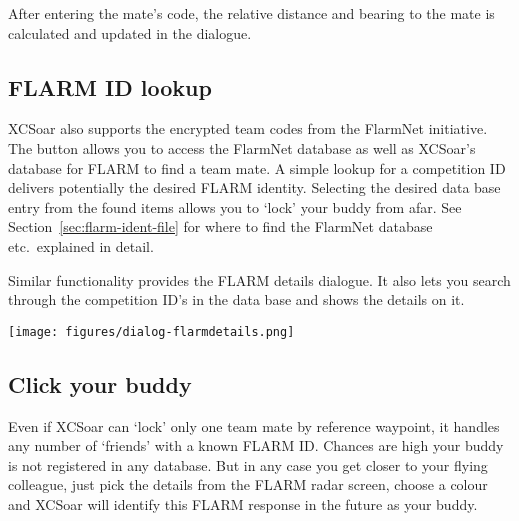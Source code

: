After entering the mate's code, the relative distance and 
bearing to the mate is calculated and updated in the dialogue.


\subsection*{FLARM ID lookup}

XCSoar also supports the encrypted team codes from the FlarmNet initiative.
The  button allows you to access the FlarmNet database as well
as XCSoar's database for FLARM to find a team mate. A simple
lookup for a competition ID delivers potentially the desired 
FLARM identity. Selecting the desired data base entry from the found items allows you 
to `lock' your buddy from afar. See Section~\ref{sec:flarm-ident-file} for
where to find the FlarmNet database etc.\ explained in detail.

Similar functionality provides the FLARM details dialogue. It also lets
you search through the competition ID's in the data base and shows the details on it.  

\begin{center}
\texttt{[image: figures/dialog-flarmdetails.png]}
\end{center}


\subsection*{Click your buddy}
Even if XCSoar can `lock' only one team mate by reference waypoint, 
it handles any number of `friends' with a known FLARM ID. Chances are high your buddy is not
registered in any database. But in any case you get closer to 
your flying colleague, just pick the details from the FLARM radar screen, choose
a colour and XCSoar will identify this FLARM response in the future as your buddy.
